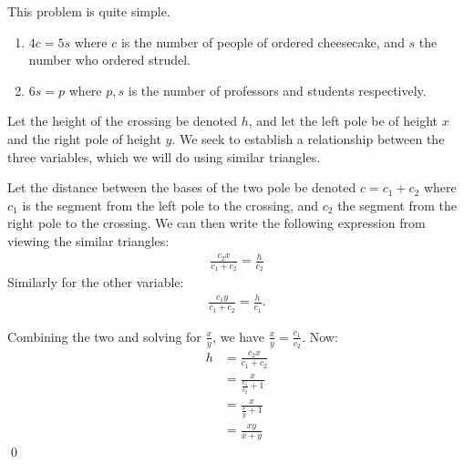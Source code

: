 \setcounter{Exercise}{4}
\begin{Exercise}
	This problem is quite simple.
	\begin{enumerate}
		\item $4c=5s$ where $c$ is the number of people of ordered cheesecake, and $s$ the number who ordered strudel.
		\item $6s = p$ where $p, s$ is the number of professors and students respectively.
	\end{enumerate}
\end{Exercise}

\begin{Exercise}
Let the height of the crossing be denoted $h$, and let the left pole be of height $x$ and the right pole of height $y$.
We seek to establish a relationship between the three variables, which we will do using similar triangles.

Let the distance between the bases of the two pole be denoted $c = c_1 + c_2$ where $c_1$ is the segment from the left pole
to the crossing, and $c_2$ the segment from the right pole to the crossing. 
We can then write the following expression from viewing the similar triangles:
\begin{align}
	\frac{c_2 x}{c_1 + c_2} = \frac{h}{c_2}
\end{align}
Similarly for the other variable:
\begin{align}
	\frac{c_1 y}{c_1 + c_2} = \frac{h}{c_1}.
\end{align}

Combining the two and solving for $\frac{x}{y}$, we have $\frac{x}{y} = \frac{c_1}{c_2}$. 
Now:
\begin{align}
	h &= \frac{c_2 x}{c_1 + c_2} \\
	&= \frac{x}{\frac{c_1}{c_2} + 1} \\
	&= \frac{x}{\frac{x}{y} + 1} \\
	&= \frac{xy}{x+y}
\end{align} \qed
\end{Exercise}

